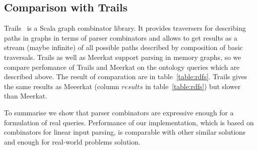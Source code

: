 \subsection{Comparison with Trails}

Trails~\cite{ScalaGraphParsing} is a Scala graph combinator library.
It provides traversers for describing paths in graphs in terms of parser combinators and allows to get results as a stream (maybe infinite) of all possible paths described by composition of basic traversals.
Trails as well as Meerkat support parsing in memory graphs, so we compare perfomance of Trails and Meerkat on the ontology queries which are described above.
The result of comparation are in table~\ref{table:rdfs}.
Trails gives the same results as Meeerkat (column $results$ in table~\ref{table:rdfs}) but slower than Meerkat.

To summarise we show that parser combinators are expressive enough for a formulation of real queries.
Performance of our implementation, which is based on combinators for linear input parsing, is comparable with other similar solutions and enough for real-world problems solution.
